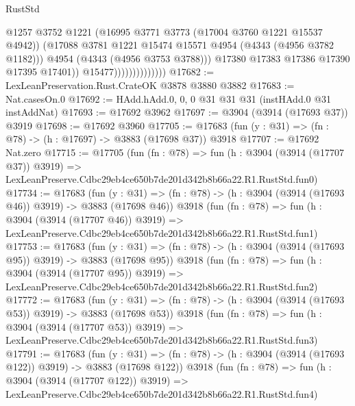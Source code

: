 \begin{lexlean}{RustStd}
\begin{coremodule}
                                      @1257
                                      @3752
                                      @1221
                                      (@16995 @3771 @3773 (@17004 @3760 @1221 @15537 @4942))
                                      (@17088
                                        @3781
                                        @1221
                                        @15474
                                        @15571
                                        @4954
                                        (@4343 (@4956 @3782 @1182)))
                                      @4954
                                      (@4343 (@4956 @3753 @3788)))
                                    @17380
                                    @17383
                                    @17386
                                    @17390
                                    @17395
                                    @17401))
                                @15477))))))))))))))
@17682 := LexLeanPreservation.Rust.CrateOK @3878 @3880 @3882
@17683 := Nat.casesOn.{0}
@17692 := HAdd.hAdd.{0, 0, 0} @31 @31 @31 (instHAdd.{0} @31 instAddNat)
@17693 := @17692 @3962
@17697 := @3904 (@3914 (@17693 @37)) @3919
@17698 := @17692 @3960
@17705 := @17683 (fun (y : @31) => (fn : @78) -> (h : @17697) -> @3883 (@17698 @37)) @3918
@17707 := @17692 Nat.zero
@17715 := @17705
    (fun (fn : @78) =>
    fun (h : @3904 (@3914 (@17707 @37)) @3919) =>
    LexLeanPreserve.Cdbc29eb4ce650b7de201d342b8b66a22.R1.RustStd.fun0)
@17734 := @17683
    (fun (y : @31) => (fn : @78) -> (h : @3904 (@3914 (@17693 @46)) @3919) -> @3883 (@17698 @46))
    @3918
    (fun (fn : @78) =>
    fun (h : @3904 (@3914 (@17707 @46)) @3919) =>
    LexLeanPreserve.Cdbc29eb4ce650b7de201d342b8b66a22.R1.RustStd.fun1)
@17753 := @17683
    (fun (y : @31) => (fn : @78) -> (h : @3904 (@3914 (@17693 @95)) @3919) -> @3883 (@17698 @95))
    @3918
    (fun (fn : @78) =>
    fun (h : @3904 (@3914 (@17707 @95)) @3919) =>
    LexLeanPreserve.Cdbc29eb4ce650b7de201d342b8b66a22.R1.RustStd.fun2)
@17772 := @17683
    (fun (y : @31) => (fn : @78) -> (h : @3904 (@3914 (@17693 @53)) @3919) -> @3883 (@17698 @53))
    @3918
    (fun (fn : @78) =>
    fun (h : @3904 (@3914 (@17707 @53)) @3919) =>
    LexLeanPreserve.Cdbc29eb4ce650b7de201d342b8b66a22.R1.RustStd.fun3)
@17791 := @17683
    (fun (y : @31) => (fn : @78) -> (h : @3904 (@3914 (@17693 @122)) @3919) -> @3883 (@17698 @122))
    @3918
    (fun (fn : @78) =>
    fun (h : @3904 (@3914 (@17707 @122)) @3919) =>
    LexLeanPreserve.Cdbc29eb4ce650b7de201d342b8b66a22.R1.RustStd.fun4)

\end{coremodule}
\end{lexlean}
